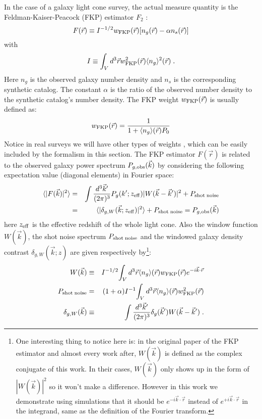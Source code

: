 \documentclass[prd,amsmath,amssymb,floatfix,superscriptaddress,nofootinbib,twocolumn]{revtex4-1}
\def\be{\begin{equation}}
\def\ee{\end{equation}}
\newcommand{\vk}{\vec{k}}
\newcommand{\eql}[1]{\label{eq:#1}}
\begin{document}
In the case of a galaxy light cone survey, the actual measure quantity is the Feldman-Kaiser-Peacock (FKP) estimator $F_{2}$ \cite{Feldman:1993ky}:
\be
F(\vec{r})\equiv I^{-1/2}w_{\rm FKP}(\vec{r})[n_{g}(\vec{r})-\alpha n_{s}(\vec{r})]
\ee
with
\be
I\equiv\int_{V} d^{3}\vec{r}w_{\rm FKP}^{2}(\vec{r})\langle n_{ g}\rangle^{2}(\vec{r})\;.
\ee
Here $n_{g}$ is the observed galaxy number density and $n_{s}$ is the corresponding synthetic catalog. The constant $\alpha$ is the ratio of the observed number density to the synthetic catalog's number density. The FKP weight $w_{\rm FKP}(\vec{r})$ is usually defined as:
\begin{eqnarray}
w_{\rm FKP}(\vec{r})=\frac{1}{1+\langle n_{g}\rangle (\vec{r})P_{0}}
\end{eqnarray}
Notice in real surveys we will have other types of weights \cite{Gil-Marin:2014sta}\cite{Gil-Marin:2018cgo}, which can be easily included by the formalism in this section. The FKP estimator $F(\vec{r})$ is related to the observed galaxy power spectrum $P_{g,\rm obs}(\vec{k})$ by considering the following expectation value (diagonal elements) in Fourier space:
\begin{eqnarray}
\langle |F(\vec{k})|^{2}\rangle &=&\int \frac{d^{3}\vec{k}'}{(2\pi)^3}P_{g}(k';z_{\rm eff})|W(\vec{k}-\vec{k}')|^2+P_{\rm shot \; noise}\nonumber\\
&=&\langle |\delta_{g,W}(\vec{k};z_{\rm eff})|^2 \rangle+P_{\rm shot \; noise}=P_{g,\rm obs}(\vec{k})
\end{eqnarray}
here $z_{\rm eff}$ is the effective redshift of the whole light cone. Also the window function $W(\vk)$, the shot noise spectrum $P_{\rm shot \; noise}$ and the windowed galaxy density contrast $\delta_{g,W}(\vk;z)$ are given respectively by\footnote{One interesting thing to notice here is: in the original paper of the FKP estimator \cite{Feldman:1993ky} and almost every work after, $W(\vk)$ is defined as the complex conjugate of this work. In their cases, $W(\vk)$ only shows up in the form of $|W(\vk)|^2$ so it won't make a difference. However in this work we demonstrate using simulations that it should be $e^{-i\vec{k}\cdot \vec{r}}$ instead of $e^{+i\vec{k}\cdot \vec{r}}$ in the integrand, same as the definition of the Fourier transform.}:
\begin{eqnarray}
W(\vec{k})&\equiv &I^{-1/2}{\int_{V} d^{3}\vec{r} \langle n_{g}\rangle(\vec{r})w_{\rm FKP}(\vec{r})e^{-i\vec{k}\cdot \vec{r}}  }\eql{WinF}\\
P_{\rm shot \; noise}&=&(1+\alpha)I^{-1}{\int_{V}d^{3}\vec{r} \langle n_{g}\rangle (\vec{r}) w_{\rm FKP}^{2}(\vec{r})}\\
\delta_{g,W}(\vec{k})&\equiv& \int \frac{d^{3}\vec{k}'}{(2\pi)^3} \delta_{g}(\vec{k}')W(\vec{k}-\vec{k}')\eql{WinD}\;.
\end{eqnarray}
\end{document}
